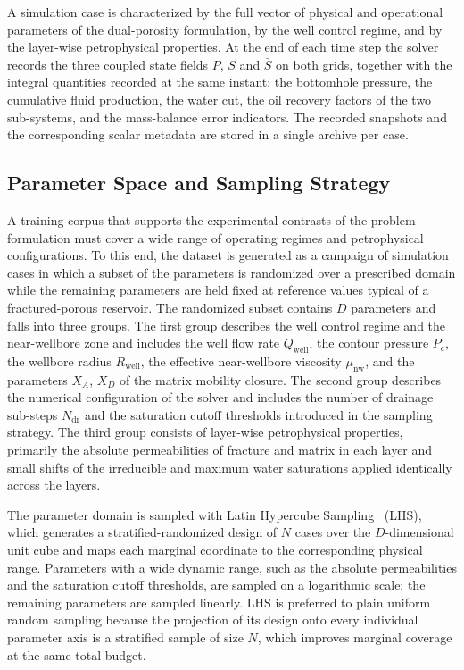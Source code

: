 A simulation case is characterized by the full vector of physical and operational parameters of the dual-porosity formulation, by the well control regime, and by the layer-wise petrophysical properties. At the end of each time step the solver records the three coupled state fields $P$, $S$ and $\bar{S}$ on both grids, together with the integral quantities recorded at the same instant: the bottomhole pressure, the cumulative fluid production, the water cut, the oil recovery factors of the two sub-systems, and the mass-balance error indicators. The recorded snapshots and the corresponding scalar metadata are stored in a single archive per case.

\subsection{Parameter Space and Sampling Strategy}
\label{subsec:method_sampling}

A training corpus that supports the experimental contrasts of the problem formulation must cover a wide range of operating regimes and petrophysical configurations. To this end, the dataset is generated as a campaign of simulation cases in which a subset of the parameters is randomized over a prescribed domain while the remaining parameters are held fixed at reference values typical of a fractured-porous reservoir. The randomized subset contains $D$ parameters and falls into three groups. The first group describes the well control regime and the near-wellbore zone and includes the well flow rate $Q_{\text{well}}$, the contour pressure $P_{\text{c}}$, the wellbore radius $R_{\text{well}}$, the effective near-wellbore viscosity $\mu_{\text{nw}}$, and the parameters $X_A$, $X_D$ of the matrix mobility closure. The second group describes the numerical configuration of the solver and includes the number of drainage sub-steps $N_{\text{dr}}$ and the saturation cutoff thresholds introduced in the sampling strategy. The third group consists of layer-wise petrophysical properties, primarily the absolute permeabilities of fracture and matrix in each layer and small shifts of the irreducible and maximum water saturations applied identically across the layers.

The parameter domain is sampled with Latin Hypercube Sampling~\cite{mckay2000lhs} (LHS), which generates a stratified-randomized design of $N$ cases over the $D$-dimensional unit cube and maps each marginal coordinate to the corresponding physical range. Parameters with a wide dynamic range, such as the absolute permeabilities and the saturation cutoff thresholds, are sampled on a logarithmic scale; the remaining parameters are sampled linearly. LHS is preferred to plain uniform random sampling because the projection of its design onto every individual parameter axis is a stratified sample of size $N$, which improves marginal coverage at the same total budget.

